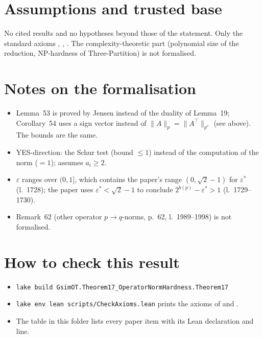 \section{Assumptions and trusted base}
No cited results and no hypotheses beyond those of the statement. Only the standard axioms ,
, . The complexity-theoretic part (polynomial size of the reduction,
NP-hardness of Three-Partition) is not formalised.

\section{Notes on the formalisation}
\begin{itemize}
\item Lemma~53 is proved by Jensen instead of the duality of Lemma~19; Corollary~54 uses a sign vector
  instead of $\|A\|_p=\|A^\top\|_{p^*}$ (see above). The bounds are the same.
\item YES-direction: the Schur test (bound $\le1$) instead of the computation of the norm ($=1$);
   assumes $a_i\ge2$.
\item $\varepsilon$ ranges over $(0,1]$, which contains the paper's range $(0,\sqrt2-1)$ for $\varepsilon^*$
  (l.~1728); the paper uses $\varepsilon^*<\sqrt2-1$ to conclude $2^{b(p)}-\varepsilon^*>1$ (l.~1729--1730).
\item Remark~62 (other operator $p\to q$-norms, p.~62, l.~1989--1998) is not formalised.
\end{itemize}

\section{How to check this result}
\begin{itemize}
\item \texttt{lake build GsimOT.Theorem17\_OperatorNormHardness.Theorem17}
\item \texttt{lake env lean scripts/CheckAxioms.lean} prints the axioms of
   and .
\item The table  in this folder lists every paper item with its Lean
  declaration and line.
\end{itemize}

